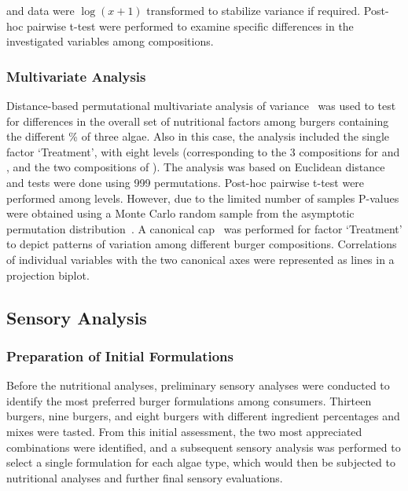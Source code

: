 
and data were $ \log(x + 1) $ transformed to stabilize variance if required. Post-hoc pairwise t-test were performed to examine specific differences in the investigated variables among compositions.

\subsubsection{Multivariate Analysis}
Distance-based permutational multivariate analysis of variance~\parencite{anderson_new_2001} was used to test for differences in the overall set of nutritional factors among burgers containing the different \% of three algae. Also in this case, the analysis included the single factor ‘Treatment’, with eight levels (corresponding to the 3 compositions for  and , and the two compositions of ). The analysis was based on Euclidean distance and tests were done using 999 permutations. Post-hoc pairwise t-test were performed among levels. However, due to the limited number of samples P-values were obtained using a Monte Carlo random sample from the asymptotic permutation distribution~\parencite{anderson_Generalized_2003}. A canonical \gls{cap}~\parencite{anderson_CANONICAL_2003} was performed for factor ‘Treatment’ to depict patterns of variation among different burger compositions. Correlations of individual variables with the two canonical axes were represented as lines in a projection biplot.

\subsection{Sensory Analysis}
\subsubsection{Preparation of Initial Formulations}
Before the nutritional analyses, preliminary sensory analyses were conducted to identify the most preferred burger formulations among consumers. Thirteen  burgers, nine  burgers, and eight  burgers with different ingredient percentages and mixes were tasted. From this initial assessment, the two most appreciated combinations were identified, and a subsequent sensory analysis was performed to select a single formulation for each algae type, which would then be subjected to nutritional analyses and further final sensory evaluations.

